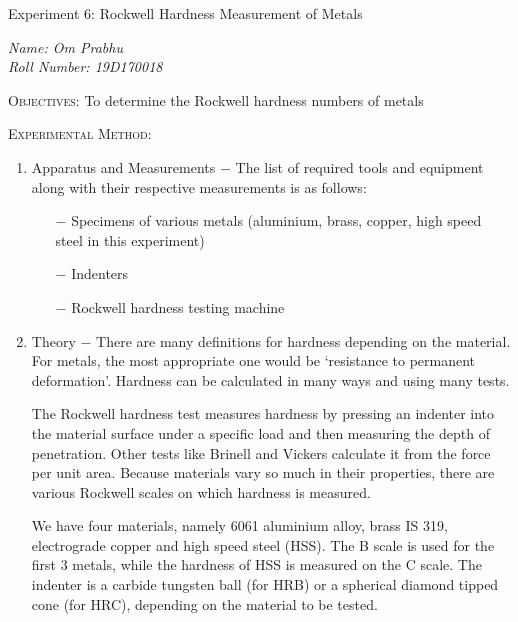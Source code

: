 \documentclass[a4paper, 11pt]{article}
\begin{document}
\begin{center}
	{\Large \sc Experiment 6: Rockwell Hardness Measurement of Metals}
\end{center}
\textit{Name: Om Prabhu\\
Roll Number: 19D170018}
\vspace{-1.5mm}

\hrulefill
\vspace{2mm}

\textsc{Objectives:} To determine the Rockwell hardness numbers of metals
\vspace{2mm}

\textsc{Experimental Method:}
\vspace{-2mm}

\begin{enumerate}[label=(\alph*)]
	\item { Apparatus and Measurements} $-$ The list of required tools and equipment along with their respective measurements is as follows:
\vspace{-2mm}

	\begin{itemize}
		\item[$-$] Specimens of various metals (aluminium, brass, copper, high speed steel in this experiment)
		\item[$-$] Indenters
		\item[$-$] Rockwell hardness testing machine
	\end{itemize}
	
	\item {Theory} $-$ There are many definitions for hardness depending on the material. For metals, the most appropriate one would be `resistance to permanent deformation'. Hardness can be calculated in many ways and using many tests.
	
The Rockwell hardness test measures hardness by pressing an indenter into the material surface under a specific load and then measuring the depth of penetration. Other tests like Brinell and Vickers calculate it from the force per unit area. Because materials vary so much in their properties, there are various Rockwell scales on which hardness is measured. 

We have four materials, namely 6061 aluminium alloy, brass IS 319, electrograde copper and high speed steel (HSS). The B scale is used for the first 3 metals, while the hardness of HSS is measured on the C scale. The indenter is a carbide tungsten ball (for HRB) or a spherical diamond tipped cone (for HRC), depending on the material to be tested. 


\end{enumerate}
\end{document}
